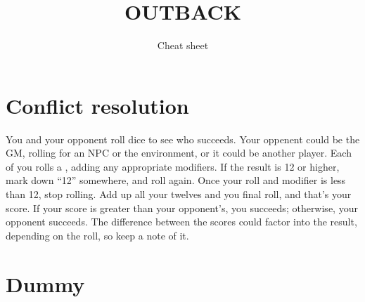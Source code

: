 \documentclass[10pt, a4paper, twocolumn]{article}
\title{\uppercase{OUTBACK}}
\subtitle{Cheat sheet}
\date{}
\begin{document}
\maketitle

\section{Conflict resolution}
You and your opponent roll dice to see who succeeds. Your oppenent could be the
GM, rolling for an NPC or the environment, or it could be another player. Each
of you rolls a , adding any appropriate modifiers. If the result is 12
or higher, mark down ``12'' somewhere, and roll again. Once your roll and
modifier is less than 12, stop rolling. Add up all your twelves and you final
roll, and that's your score. If your score is greater than your
opponent's, you succeeds; otherwise, your opponent succeeds. The difference
between the scores could factor into the result, depending on the roll, so keep
a note of it.
\section{Dummy}
\lipsum{}
\end{document}
